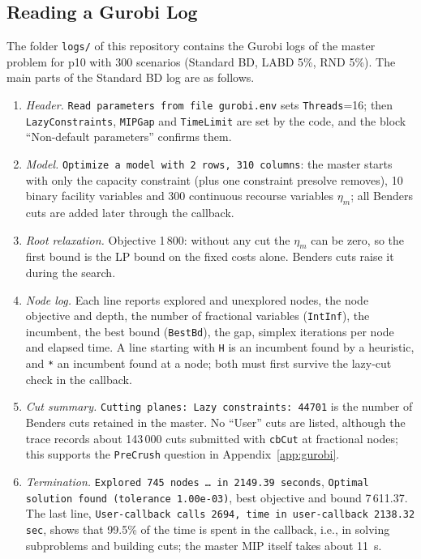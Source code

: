 \subsection{Reading a Gurobi Log}\label{app:gurobilog}

The folder \texttt{logs/} of this repository contains the Gurobi logs of the master problem for p10 with 300 scenarios (Standard BD, LABD 5\%, RND 5\%). The main parts of the Standard BD log are as follows.

\begin{enumerate}
\item \emph{Header.} \texttt{Read parameters from file gurobi.env} sets \texttt{Threads}=16; then \texttt{LazyConstraints}, \texttt{MIPGap} and \texttt{TimeLimit} are set by the code, and the block ``Non-default parameters'' confirms them.
\item \emph{Model.} \texttt{Optimize a model with 2 rows, 310 columns}: the master starts with only the capacity constraint (plus one constraint presolve removes), 10 binary facility variables and 300 continuous recourse variables $\eta_m$; all Benders cuts are added later through the callback.
\item \emph{Root relaxation.} Objective 1\,800: without any cut the $\eta_m$ can be zero, so the first bound is the LP bound on the fixed costs alone. Benders cuts raise it during the search.
\item \emph{Node log.} Each line reports explored and unexplored nodes, the node objective and depth, the number of fractional variables (\texttt{IntInf}), the incumbent, the best bound (\texttt{BestBd}), the gap, simplex iterations per node and elapsed time. A line starting with \texttt{H} is an incumbent found by a heuristic, and \texttt{*} an incumbent found at a node; both must first survive the lazy-cut check in the callback.
\item \emph{Cut summary.} \texttt{Cutting planes: Lazy constraints: 44701} is the number of Benders cuts retained in the master. No ``User'' cuts are listed, although the trace records about 143\,000 cuts submitted with \texttt{cbCut} at fractional nodes; this supports the \texttt{PreCrush} question in Appendix~\ref{app:gurobi}.
\item \emph{Termination.} \texttt{Explored 745 nodes \ldots\ in 2149.39 seconds}, \texttt{Optimal solution found (tolerance 1.00e-03)}, best objective and bound 7\,611.37. The last line, \texttt{User-callback calls 2694, time in user-callback 2138.32 sec}, shows that 99.5\% of the time is spent in the callback, i.e., in solving subproblems and building cuts; the master MIP itself takes about 11~s.
\end{enumerate}

